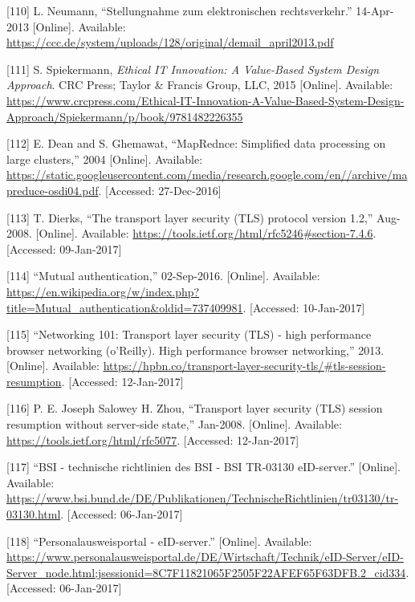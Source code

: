 \documentclass[12pt,english,a4paper,titlepage,cleardoublepage=empty,dottedtoc]{report}
\begin{document}
\hypertarget{ref-statement_2013_de-mail}{}
{[}110{]} L. Neumann, ``Stellungnahme zum elektronischen
rechtsverkehr.'' 14-Apr-2013 {[}Online{]}. Available:
\url{https://ccc.de/system/uploads/128/original/demail_april2013.pdf}

\hypertarget{ref-book_2015_ethical-it-innovation}{}
{[}111{]} S. Spiekermann, \emph{Ethical IT Innovation: A Value-Based
System Design Approach}. CRC Press; Taylor \& Francis Group, LLC, 2015
{[}Online{]}. Available:
\url{https://www.crcpress.com/Ethical-IT-Innovation-A-Value-Based-System-Design-Approach/Spiekermann/p/book/9781482226355}

\hypertarget{ref-paper_2004_distributed-mapreduce}{}
{[}112{]} E. Dean and S. Ghemawat, ``MapRednce: Simplified data
processing on large clusters,'' 2004 {[}Online{]}. Available:
\url{https://static.googleusercontent.com/media/research.google.com/en//archive/mapreduce-osdi04.pdf}.
{[}Accessed: 27-Dec-2016{]}

\hypertarget{ref-web_spec_tls-12_client-auth}{}
{[}113{]} T. Dierks, ``The transport layer security (TLS) protocol
version 1.2,'' Aug-2008. {[}Online{]}. Available:
\url{https://tools.ietf.org/html/rfc5246\#section-7.4.6}. {[}Accessed:
09-Jan-2017{]}

\hypertarget{ref-web_2017_wikipedia_mutual-auth}{}
{[}114{]} ``Mutual authentication,'' 02-Sep-2016. {[}Online{]}.
Available:
\url{https://en.wikipedia.org/w/index.php?title=Mutual_authentication\&oldid=737409981}.
{[}Accessed: 10-Jan-2017{]}

\hypertarget{ref-book_2013_networking-101_tls-session-resumption}{}
{[}115{]} ``Networking 101: Transport layer security (TLS) - high
performance browser networking (o'Reilly). High performance browser
networking,'' 2013. {[}Online{]}. Available:
\url{https://hpbn.co/transport-layer-security-tls/\#tls-session-resumption}.
{[}Accessed: 12-Jan-2017{]}

\hypertarget{ref-web_spec_tls-session-ticket-resumption}{}
{[}116{]} P. E. Joseph Salowey H. Zhou, ``Transport layer security (TLS)
session resumption without server-side state,'' Jan-2008. {[}Online{]}.
Available: \url{https://tools.ietf.org/html/rfc5077}. {[}Accessed:
12-Jan-2017{]}

\hypertarget{ref-web_bsi-spec_eid}{}
{[}117{]} ``BSI - technische richtlinien des BSI - BSI TR-03130
eID-server.'' {[}Online{]}. Available:
\url{https://www.bsi.bund.de/DE/Publikationen/TechnischeRichtlinien/tr03130/tr-03130.html}.
{[}Accessed: 06-Jan-2017{]}

\hypertarget{ref-web_2017_npa-eid-server}{}
{[}118{]} ``Personalausweisportal - eID-server.'' {[}Online{]}.
Available:
\url{https://www.personalausweisportal.de/DE/Wirtschaft/Technik/eID-Server/eID-Server_node.html;jsessionid=8C7F11821065F2505F22AFEF65F63DFB.2_cid334}.
{[}Accessed: 06-Jan-2017{]}
\end{document}
